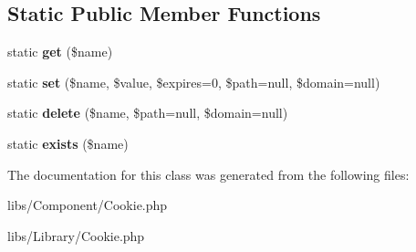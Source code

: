 \subsection*{Static Public Member Functions}
\begin{DoxyCompactItemize}
\item 
\hypertarget{classCookie_a65288a37ccfff510fe7d70bab528ff52}{
static {\bfseries get} (\$name)}
\label{classCookie_a65288a37ccfff510fe7d70bab528ff52}

\item 
\hypertarget{classCookie_ac77874de8721947c0a4d97062c147938}{
static {\bfseries set} (\$name, \$value, \$expires=0, \$path=null, \$domain=null)}
\label{classCookie_ac77874de8721947c0a4d97062c147938}

\item 
\hypertarget{classCookie_a4f28e828c9a79fcf1a544cd9abb79ede}{
static {\bfseries delete} (\$name, \$path=null, \$domain=null)}
\label{classCookie_a4f28e828c9a79fcf1a544cd9abb79ede}

\item 
\hypertarget{classCookie_ad51a1a42a8cb4a60611e6dd1791478ac}{
static {\bfseries exists} (\$name)}
\label{classCookie_ad51a1a42a8cb4a60611e6dd1791478ac}

\end{DoxyCompactItemize}


The documentation for this class was generated from the following files:\begin{DoxyCompactItemize}
\item 
libs/Component/Cookie.php\item 
libs/Library/Cookie.php\end{DoxyCompactItemize}
